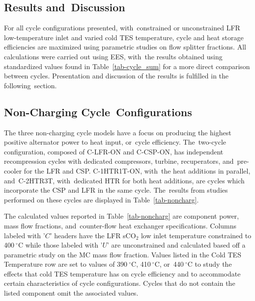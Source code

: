 \documentclass[sustainability,article,accept,moreauthors,pdftex]{Definitions/mdpi}
\newcommand{\mw}[1]{\comment[id=MW]{#1}}
\begin{document}
\begin{paracol}{2}
\section{Results and~Discussion}

For all cycle configurations presented, with~constrained or unconstrained LFR low-temperature inlet and varied cold TES temperature, cycle and heat storage efficiencies are maximized using parametric studies on flow splitter fractions. %
{All calculations were carried out using EES, with~the results}
obtained using standardized values found in \mbox{Table \ref{tab-cycle_sum}} for a more direct comparison between cycles. Presentation and discussion of the results is fulfilled in the following~section. 

\subsection{Non-Charging Cycle~Configurations}

The three non-charging cycle models have a focus on producing the highest positive alternator power to heat input, or~cycle efficiency. The~two-cycle configuration, composed of C-LFR-ON and C-CSP-ON, has independent recompression cycles with dedicated compressors, turbine, recuperators, and~pre-cooler for the LFR and CSP. C-1HTR1T-ON, with~the heat additions in parallel, and~C-2HTR3T, with~dedicated HTR for both heat additions, are cycles which incorporate the CSP and LFR in the same cycle. The~results from studies performed on these cycles are displayed in Table~\ref{tab-noncharg}. 

The calculated values reported in Table~\ref{tab-noncharg} are component power, mass flow fractions, and~counter-flow heat exchanger specifications. Columns labeled with '$C$' headers have the LFR sCO$_2$ low inlet temperature constrained to 400$~^{\circ}$C while those labeled with '$U$' are unconstrained and calculated based off a parametric study on the MC mass flow fraction. Values listed in the Cold TES Temperature row are set to values of 390$~^{\circ}$C, 410$~^{\circ}$C, or~440$~^{\circ}$C to study the effects that cold TES temperature has on cycle efficiency and to accommodate certain characteristics of cycle configurations. %
{Cycles that do not contain the listed component omit the associated values.}
\clearpage 
\end{paracol}
\end{document}
